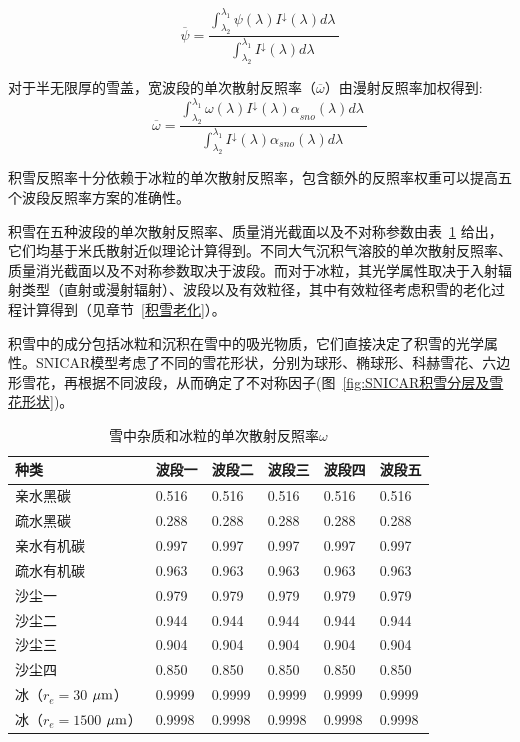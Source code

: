 \begin{equation}
\overline{\psi} = \frac{\int_{\lambda_{2}}^{\lambda_{1}}{\psi(\lambda)I^{\downarrow}(\lambda)d\lambda\ }}{\int_{\lambda_{2}}^{\lambda_{1}}{I^{\downarrow}(\lambda)d\lambda\ }}
\end{equation}

对于半无限厚的雪盖，宽波段的单次散射反照率（\(\overline{\omega}\)）由漫射反照率加权得到:
\begin{equation}
\overline{\omega} = \frac{\int_{\lambda_{2}}^{\lambda_{1}}{\omega(\lambda){I^{\downarrow}(\lambda)\alpha}_{sno}(\lambda)d\lambda\ }}{\int_{\lambda_{2}}^{\lambda_{1}}{I^{\downarrow}(\lambda)\alpha_{sno}(\lambda)d\lambda\ }}
\end{equation}

积雪反照率十分依赖于冰粒的单次散射反照率，包含额外的反照率权重可以提高五个波段反照率方案的准确性\citep{flanner2007PresentdayClimateForcing}。

积雪在五种波段的单次散射反照率、质量消光截面以及不对称参数由表~\ref{tab:积雪单次散射反照率} 给出，它们均基于米氏散射近似理论计算得到。不同大气沉积气溶胶的单次散射反照率、质量消光截面以及不对称参数取决于波段。而对于冰粒，其光学属性取决于入射辐射类型（直射或漫射辐射）、波段以及有效粒径，其中有效粒径考虑积雪的老化过程计算得到（见章节~\ref{积雪老化}）。

积雪中的成分包括冰粒和沉积在雪中的吸光物质，它们直接决定了积雪的光学属性。SNICAR模型考虑了不同的雪花形状，分别为球形、椭球形、科赫雪花、六边形雪花\citep{he2017ImpactSnowGrain}，再根据不同波段，从而确定了不对称因子(图~\ref{fig:SNICAR积雪分层及雪花形状})。

\begin{table}[htbp]
\centering
\caption{雪中杂质和冰粒的单次散射反照率$\omega$}
\label{tab:积雪单次散射反照率}
\begin{tabular}{llllll}
\toprule
种类 & 波段一 & 波段二 & 波段三 & 波段四 & 波段五 \\ \midrule
亲水黑碳 & 0.516 & 0.516 & 0.516 & 0.516 & 0.516 \\
疏水黑碳 & 0.288 & 0.288 & 0.288 & 0.288 & 0.288 \\
亲水有机碳 & 0.997 & 0.997 & 0.997 & 0.997 & 0.997 \\
疏水有机碳 & 0.963 & 0.963 & 0.963 & 0.963 & 0.963 \\
沙尘一 & 0.979 & 0.979 & 0.979 & 0.979 & 0.979 \\
沙尘二 & 0.944 & 0.944 & 0.944 & 0.944 & 0.944 \\
沙尘三 & 0.904 & 0.904 & 0.904 & 0.904 & 0.904 \\
沙尘四 & 0.850 & 0.850 & 0.850 & 0.850 & 0.850 \\
冰（$r_{e}=30$ $\mu\rm{m}$） & 0.9999 & 0.9999 & 0.9999 & 0.9999 &
0.9999 \\
冰（$r_{e}=1500$ $\mu\rm{m}$） & 0.9998 & 0.9998 & 0.9998 & 0.9998 &
0.9998 \\ \bottomrule
\end{tabular}
\end{table}

